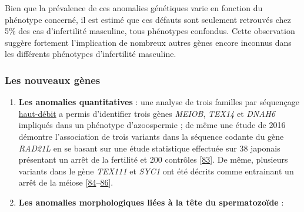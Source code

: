 \documentclass[12pt,a4paper,twoside]{ugathesis}
\theoremstyle{definition}
\theoremstyle{definition}
\theoremstyle{definition}
\theoremstyle{remark}
\begin{document}
Bien que la prévalence de ces anomalies génétiques varie en fonction du
phénotype concerné, il est estimé que ces défauts sont seulement
retrouvés chez 5\% des cas d'infertilité masculine, tous phénotypes
confondus. Cette observation suggère fortement l'implication de nombreux
autres gènes encore inconnus dans les différents phénotypes
d'infertilité masculine.

\newpage

\subsubsection{Les nouveaux gènes}\label{les-nouveaux-genes}

\begin{enumerate}
\def\labelenumi{\arabic{enumi}.}
\item
  \textbf{Les anomalies quantitatives} : une analyse de trois familles
  par séquençage \protect\hyperlink{ngs}{haut-débit} a permis
  d'identifier trois gènes \emph{MEIOB}, \emph{TEX14} et \emph{DNAH6}
  impliqués dans un phénotype d'azoospermie ; de même une étude de 2016
  démontre l'association de trois variants dans la séquence codante du
  gène \emph{RAD21L} en se basant sur une étude statistique effectuée
  sur 38 japonais présentant un arrêt de la fertilité et 200 contrôles
  {[}\protect\hyperlink{ref-Minase2017}{83}{]}. De même, plusieurs
  variants dans le gène \emph{TEX111} et \emph{SYC1} ont été décrits
  comme entrainant un arrêt de la méiose
  {[}\protect\hyperlink{ref-Yatsenko2015}{84}--\protect\hyperlink{ref-Maor-Sagie2015}{86}{]}.
\item
  \textbf{Les anomalies morphologiques liées à la tête du spermatozoïde}
  :


\end{enumerate}
\end{document}

